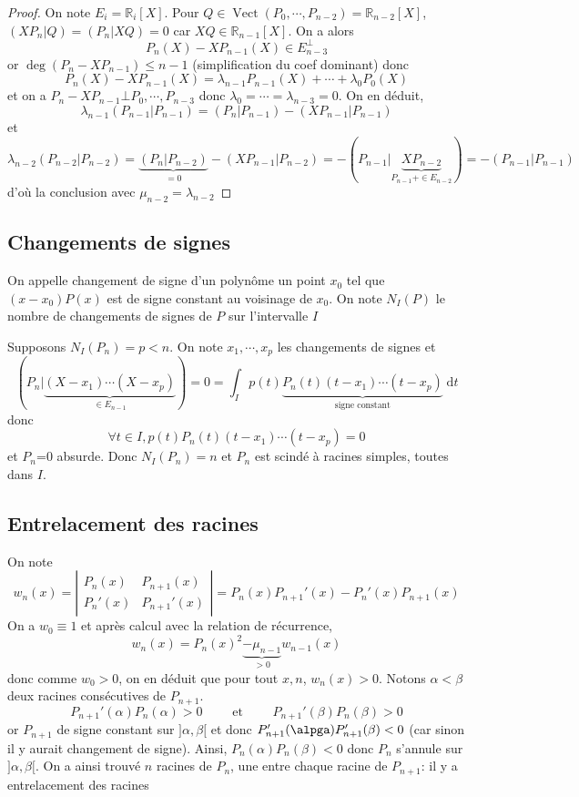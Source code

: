 \documentclass{article}
\theoremstyle{definition}
\DeclareMathOperator{\Vect}{Vect}
\begin{document}
\begin{proof} On note $E_i=\mathbb R_i[X]$.
Pour $Q\in\Vect(P_0, \cdots, P_{n-2})=\mathbb R_{n-2}[X]$, $(XP_n|Q)=(P_n|XQ)=0$ car $XQ\in\mathbb R_{n-1}[X]$. On a alors \[
    P_n(X)-XP_{n-1}(X)\in E_{n-3}^\bot
\]
or $\deg (P_n-XP_{n-1})\leq n-1$ (simplification du coef dominant) donc \[
    P_n(X)-XP_{n-1}(X)=\lambda_{n-1}P_{n-1}(X)+\cdots +\lambda_0P_0(X)
\]
et on a $P_n-XP_{n-1}\bot P_0, \cdots, P_{n-3}$ donc $\lambda_0=\cdots =\lambda_{n-3}=0$. On en déduit, \[
    \lambda_{n-1}(P_{n-1}|P_{n-1})=(P_n|P_{n-1})-(XP_{n-1}|P_{n-1})
\]
et \[
    \lambda_{n-2}(P_{n-2}|P_{n-2})=\underbrace{(P_n|P_{n-2})}_{=0}-(XP_{n-1}|P_{n-2})=-(P_{n-1}|\underbrace{XP_{n-2}}_{P_{n-1}+\in E_{n-2}})=-(P_{n-1}|P_{n-1})
\]
d'où la conclusion avec $\mu_{n-2}=\lambda_{n-2}$
\end{proof}

\subsection{Changements de signes}

On appelle changement de signe d'un polynôme un point $x_0$ tel que $(x-x_0)P(x)$ est de signe constant au voisinage de $x_0$. On note $N_I(P)$ le nombre de changements de signes de $P$ sur l'intervalle $I$

Supposons $N_I(P_n)=p<n$. On note $x_1, \cdots, x_p$ les changements de signes et \[
    (P_n | \underbrace{(X-x_1)\cdots (X-x_p)}_{\in E_{n-1}})=0=\int_Ip(t)\underbrace{P_n(t)(t-x_1)\cdots (t-x_p)}_{\text{signe constant}}\;\mathrm dt
\]
donc \[
    \forall t\in I, p(t)P_n(t)(t-x_1)\cdots (t-x_p)=0
\]
et $P_n$=0 absurde. Donc $N_I(P_n)=n$ et $P_n$ est scindé à racines simples, toutes dans $I$.

\subsection{Entrelacement des racines}

On note \[
    w_n(x)=\left|\begin{matrix}P_n(x) & P_{n+1}(x)\\ P_n'(x) & P_{n+1}'(x)\end{matrix}\right|=P_n(x)P_{n+1}'(x)-P_n'(x)P_{n+1}(x)
\]
On a $w_0\equiv 1$ et après calcul avec la relation de récurrence, \[
    w_n(x)=P_n(x)^2\underbrace{-\mu_{n-1}}_{>0}w_{n-1}(x)
\]
donc comme $w_0>0$, on en déduit que pour tout $x, n$, $w_n(x)>0$. Notons $\alpha < \beta$ deux racines consécutives de $P_{n+1}$. \[
    P_{n+1}'(\alpha)P_n(\alpha)>0\qquad \text{ et }\qquad P_{n+1}'(\beta)P_n(\beta)>0
\] or $P_{n+1}$ de signe constant sur $]\alpha, \beta[$ et donc $P_{n+1}'(\alpga)P_{n+1}'(\beta)<0$ (car sinon il y aurait changement de signe). Ainsi, $P_n(\alpha)P_n(\beta)<0$ donc $P_n$ s'annule sur $]\alpha, \beta[$. On a ainsi trouvé $n$ racines de $P_n$, une entre chaque racine de $P_{n+1}$: il y a entrelacement des racines
\end{document}
